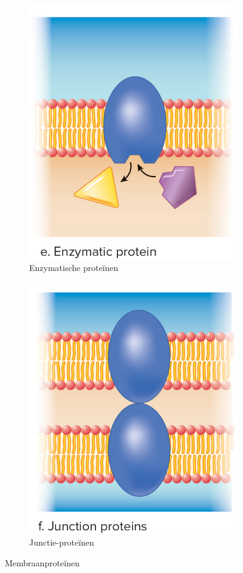\documentclass[a4paper,kul]{kulakarticle} %
\begin{document}
\begin{figure}[!htbp]
\medskip
	\begin{subfigure}{.5\textwidth}
		\centering
		\includegraphics[width=0.7\linewidth]{Enzymatischeprot}
		\caption{Enzymatische proteïnen}
		\label{fig:Enzymproteïnen}
	\end{subfigure}%
	\begin{subfigure}{.5\textwidth}
		\centering
		\includegraphics[width=0.7\linewidth]{Junctieprot}
		\caption{Junctie-proteïnen}
		\label{fig:Junctieproteïnen}
	\end{subfigure}
	\caption{Membraanproteïnen}
	\label{fig:membraanprot}
\end{figure}\\
\newpage
\end{document}
